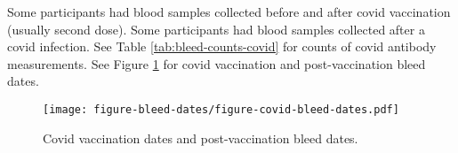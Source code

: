 \documentclass[12pt]{article}
\begin{document}
Some participants had blood samples collected before and after covid vaccination (usually second dose). Some participants had blood samples collected after a covid infection.
See Table \ref{tab:bleed-counts-covid} for counts of covid antibody measurements.
See Figure \ref{fig:covid-vax-bleed-dates} for covid vaccination and post-vaccination bleed dates.



\begin{figure}
	\texttt{[image: figure-bleed-dates/figure-covid-bleed-dates.pdf]}
	\caption{Covid vaccination dates and post-vaccination bleed dates.}
	\label{fig:covid-vax-bleed-dates}
\end{figure}
\end{document}
